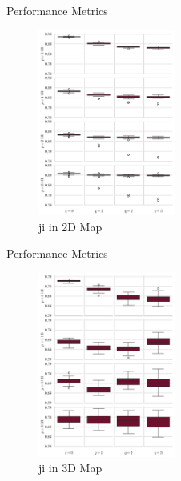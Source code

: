 \documentclass{beamer}
\begin{document}
\begin{frame}{Performance Metrics}
\begin{figure}
\centering
\includegraphics[width=0.4\textwidth]{Images/ji2D.png}
\caption{\acrlong{ji} in 2D Map}
\end{figure}
\end{frame}

\begin{frame}{Performance Metrics}
\begin{figure}
\centering
\includegraphics[width=0.4\textwidth]{Images/ji3D.png}
\caption{\acrlong{ji} in 3D Map}
\end{figure}
\end{frame}

\def\arraystretch{0.8}
\setlength{\tabcolsep}{4pt}
\abovecaptionskip=0pt
\belowcaptionskip=1pt 
\end{document}
